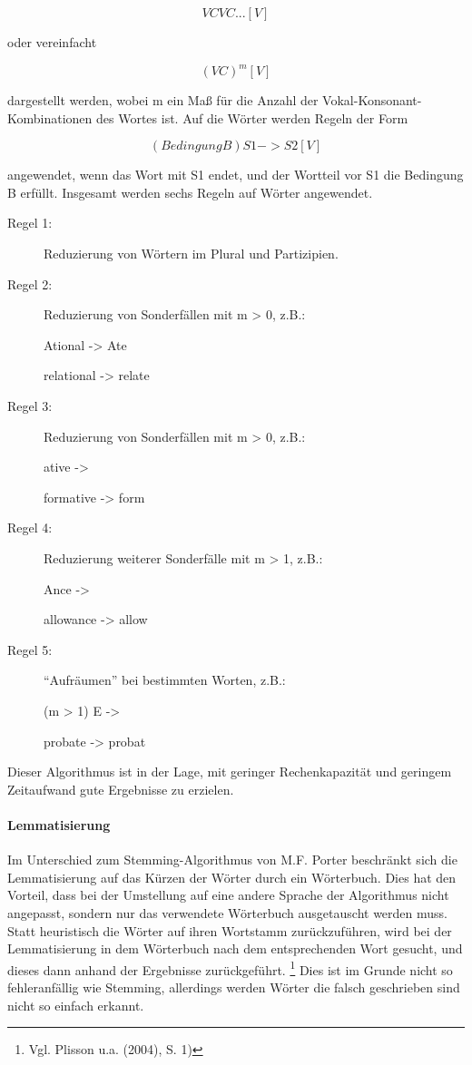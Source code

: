 \documentclass[a4paper,12pt]{article}
\begin{document}
\begin{equation}
[C]VCVC...[V]
\end{equation}

oder vereinfacht 

\begin{equation}
[C] (VC)^m [V]
\end{equation}

dargestellt werden, wobei m ein Maß für die Anzahl der Vokal-Konsonant-Kombinationen des Wortes ist. Auf die Wörter werden Regeln der Form 

\begin{equation}
[C] (Bedingung B)S1->S2 [V]
\end{equation}

angewendet, wenn das Wort mit S1 endet, und der Wortteil vor S1 die Bedingung B erfüllt. Insgesamt werden sechs Regeln auf Wörter angewendet. 

\begin{description}

\item[Regel 1:] Reduzierung von Wörtern im Plural und Partizipien.
\item[Regel 2:] Reduzierung von Sonderfällen mit m > 0, z.B.: 

Ational -> Ate

relational -> relate

\item[Regel 3:] Reduzierung von Sonderfällen mit m > 0, z.B.: 

ative ->

formative -> form

\item[Regel 4:] Reduzierung weiterer Sonderfälle mit m > 1, z.B.:

Ance ->

allowance -> allow

\item[Regel 5:] “Aufräumen” bei bestimmten Worten, z.B.:

(m > 1) E ->

probate -> probat

\end{description}

Dieser Algorithmus ist in der Lage, mit geringer Rechenkapazität und geringem Zeitaufwand gute Ergebnisse zu erzielen. 

\paragraph{Lemmatisierung}
Im Unterschied zum Stemming-Algorithmus von M.F. Porter beschränkt sich die Lemmatisierung auf das Kürzen der Wörter durch ein Wörterbuch. Dies hat den Vorteil, dass bei der Umstellung auf eine andere Sprache der Algorithmus nicht angepasst, sondern nur das verwendete Wörterbuch ausgetauscht werden muss. Statt heuristisch die Wörter auf ihren Wortstamm zurückzuführen, wird bei der Lemmatisierung in dem Wörterbuch nach dem entsprechenden Wort gesucht, und dieses dann anhand der Ergebnisse zurückgeführt. \footnote{Vgl. Plisson u.a. (2004), S. 1)} Dies ist im Grunde nicht so fehleranfällig wie Stemming, allerdings werden Wörter die falsch geschrieben sind nicht so einfach erkannt. 
\end{document}
